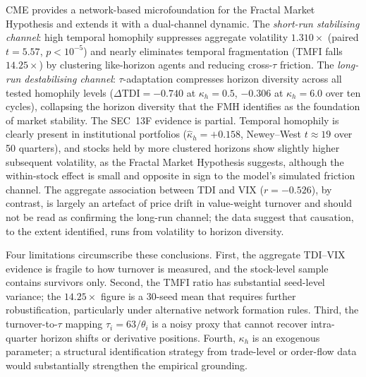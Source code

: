 \documentclass[preprint,12pt,authoryear]{elsarticle}
\begin{document}
CME provides a network-based microfoundation for the Fractal Market
Hypothesis \citep{peters1994} and extends it with a dual-channel dynamic.
The \emph{short-run stabilising channel}: high temporal homophily suppresses
aggregate volatility $1.310\times$ (paired $t = 5.57$, $p < 10^{-5}$) and nearly
eliminates temporal fragmentation (TMFI falls $14.25\times$) by clustering
like-horizon agents and reducing cross-$\tau$ friction.
The \emph{long-run destabilising channel}: $\tau$-adaptation compresses
horizon diversity across all tested homophily levels
($\Delta\mathrm{TDI} = -0.740$ at $\kappa_h = 0.5$, $-0.306$ at
$\kappa_h = 6.0$ over ten cycles), collapsing the horizon diversity that
the FMH identifies as the foundation of market stability.
The SEC~13F evidence is partial.
Temporal homophily is clearly present in institutional portfolios
($\hat{\kappa}_h = +0.158$, Newey--West $t \approx 19$ over 50 quarters), and
stocks held by more clustered horizons show slightly higher subsequent
volatility, as the Fractal Market Hypothesis suggests, although the
within-stock effect is small and opposite in sign to the model's simulated
friction channel.
The aggregate association between TDI and VIX ($r = -0.526$), by contrast, is
largely an artefact of price drift in value-weight turnover and should not be
read as confirming the long-run channel; the data suggest that causation, to
the extent identified, runs from volatility to horizon diversity.

Four limitations circumscribe these conclusions.
First, the aggregate TDI--VIX evidence is fragile to how turnover is
measured, and the stock-level sample contains survivors only.
Second, the TMFI ratio has substantial seed-level variance; the $14.25\times$
figure is a 30-seed mean that requires further robustification, particularly
under alternative network formation rules.
Third, the turnover-to-$\tau$ mapping $\tau_i = 63/\theta_i$ is a noisy
proxy that cannot recover intra-quarter horizon shifts or derivative positions.
Fourth, $\kappa_h$ is an exogenous parameter; a structural identification
strategy from trade-level or order-flow data would substantially strengthen
the empirical grounding.
\end{document}
